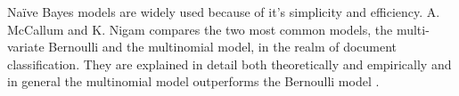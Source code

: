 	Naïve Bayes models are widely used because of it's simplicity and efficiency. A. McCallum and K. Nigam compares the two most common models, the multi-variate Bernoulli and the multinomial model, in the realm of document classification. They are explained in detail both theoretically and empirically and in general the multinomial model outperforms the Bernoulli model \cite{McCallum98acomparison}.